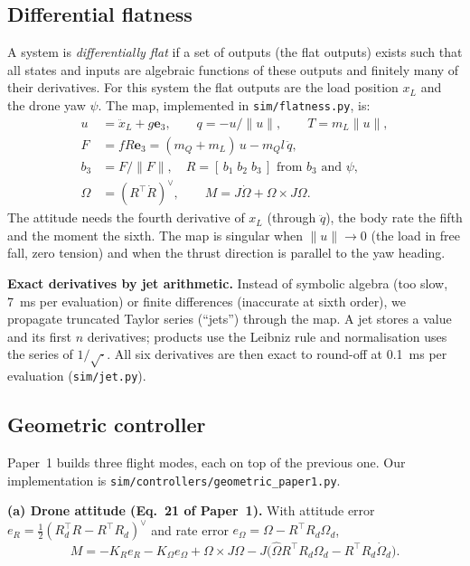 \documentclass[11pt,a4paper]{article}
\newcommand{\ethree}{\mathbf{e}_3}
\newcommand{\code}[1]{\texttt{\small #1}}
\begin{document}
\subsection{Differential flatness}
A system is \emph{differentially flat} if a set of outputs (the flat outputs) exists such that all states and inputs are
algebraic functions of these outputs and finitely many of their derivatives. For this system the flat outputs are the load
position $x_L$ and the drone yaw $\psi$. The map, implemented in \code{sim/flatness.py}, is:
\begin{align}
u &= \ddot x_L + g\ethree,\qquad q = -u/\|u\|,\qquad T = m_L\|u\|, \\
F &= f R\ethree = (m_Q+m_L)\,u - m_Q l\,\ddot q,\\
b_3 &= F/\|F\|,\quad R = [\,b_1\; b_2\; b_3\,] \text{ from } b_3 \text{ and } \psi,\\
\Omega &= (R^\top\dot R)^\vee,\qquad M = J\dot\Omega + \Omega\times J\Omega .
\end{align}
The attitude needs the fourth derivative of $x_L$ (through $\ddot q$), the body rate the fifth and the moment the sixth.
The map is singular when $\|u\|\to 0$ (the load in free fall, zero tension) and when the thrust direction is parallel
to the yaw heading.

\textbf{Exact derivatives by jet arithmetic.} Instead of symbolic algebra (too slow, 7~ms per evaluation) or
finite differences (inaccurate at sixth order), we propagate truncated Taylor series (``jets'') through the map. A jet
stores a value and its first $n$ derivatives; products use the Leibniz rule and normalisation uses the series of
$1/\sqrt{\cdot}$. All six derivatives are then exact to round-off at 0.1~ms per evaluation (\code{sim/jet.py}).

\subsection{Geometric controller}
Paper~1 builds three flight modes, each on top of the previous one. Our implementation is
\code{sim/controllers/geometric\_paper1.py}.

\textbf{(a) Drone attitude (Eq.~21 of Paper~1).} With attitude error $e_R=\tfrac12(R_d^\top R - R^\top R_d)^\vee$ and
rate error $e_\Omega = \Omega - R^\top R_d\Omega_d$,
\begin{equation}
M = -K_R e_R - K_\Omega e_\Omega + \Omega\times J\Omega - J\big(\hat\Omega R^\top R_d\Omega_d - R^\top R_d\dot\Omega_d\big).
\end{equation}
\end{document}
